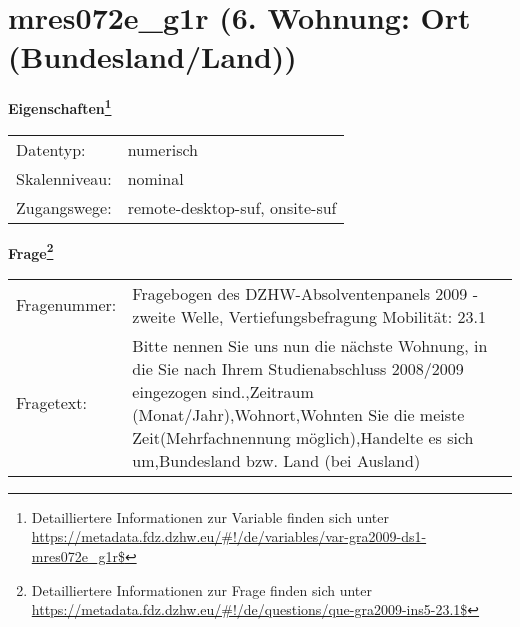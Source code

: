
    \setcounter{footnote}{0}

    \vspace*{-1.8cm}
	\section{mres072e\_g1r (6. Wohnung: Ort (Bundesland/Land))}
	\label{section:mres072e_g1r}



    \vspace*{0.5cm}
    \noindent\textbf{Eigenschaften\footnote{Detailliertere Informationen zur Variable finden sich unter
		\url{https://metadata.fdz.dzhw.eu/\#!/de/variables/var-gra2009-ds1-mres072e_g1r$}}}\\
	\begin{tabularx}{\hsize}{@{}lX}
	Datentyp: & numerisch \\
	Skalenniveau: & nominal \\
	Zugangswege: &
	  remote-desktop-suf, 
	  onsite-suf
 \\
    \end{tabularx}



				\vspace*{0.5cm}
                \noindent\textbf{Frage\footnote{Detailliertere Informationen zur Frage finden sich unter
		              \url{https://metadata.fdz.dzhw.eu/\#!/de/questions/que-gra2009-ins5-23.1$}}}\\
				\begin{tabularx}{\hsize}{@{}lX}
					Fragenummer: &
					  Fragebogen des DZHW-Absolventenpanels 2009 - zweite Welle, Vertiefungsbefragung Mobilität:
					  23.1
 \\
					Fragetext: & Bitte nennen Sie uns nun die nächste Wohnung, in die Sie nach Ihrem Studienabschluss 2008/2009 eingezogen sind.,Zeitraum (Monat/Jahr),Wohnort,Wohnten Sie die meiste Zeit(Mehrfachnennung möglich),Handelte es sich um,Bundesland bzw. Land (bei Ausland) \\
				\end{tabularx}





